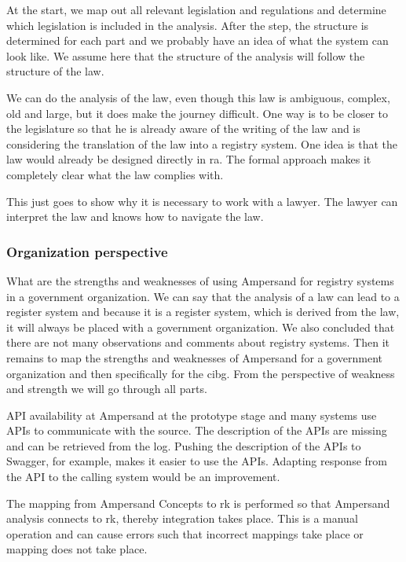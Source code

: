 At the start, we map out all relevant legislation and regulations and determine which legislation is included in the analysis.
After the step, the structure is determined for each part and we probably have an idea of what the system can look like.
We assume here that the structure of the analysis will follow the structure of the law.

We can do the analysis of the law, even though this law is ambiguous, complex, old and large, but it does make the journey difficult.
One way is to be closer to the legislature so that he is already aware of the writing of the law and is considering the translation of the law into a registry system.
One idea is that the law would already be designed directly in \acrshort{ra}.
The formal approach makes it completely clear what the law complies with.

This just goes to show why it is necessary to work with a lawyer.
The lawyer can interpret the law and knows how to navigate the law.

\subsubsection{Organization perspective}\label{subsub:organization_perspective}
What are the strengths and weaknesses of using Ampersand for registry systems in a government organization.
We can say that the analysis of a law can lead to a register system and because it is a register system, which is derived from the law, it will always be placed with a government organization.
We also concluded that there are not many observations and comments about registry systems.
Then it remains to map the strengths and weaknesses of Ampersand for a government organization and then specifically for the \acrshort{cibg}.
From the perspective of weakness and strength we will go through all parts.

API availability at Ampersand at the prototype stage and many systems use APIs to communicate with the source.
The description of the APIs are missing and can be retrieved from the log.
Pushing the description of the APIs to Swagger, for example, makes it easier to use the APIs.
Adapting response from the API to the calling system would be an improvement.

The mapping from Ampersand Concepts to \acrshort{rk} is performed so that Ampersand analysis connects to \acrshort{rk}, thereby integration takes place.
This is a manual operation and can cause errors such that incorrect mappings take place or mapping does not take place.

